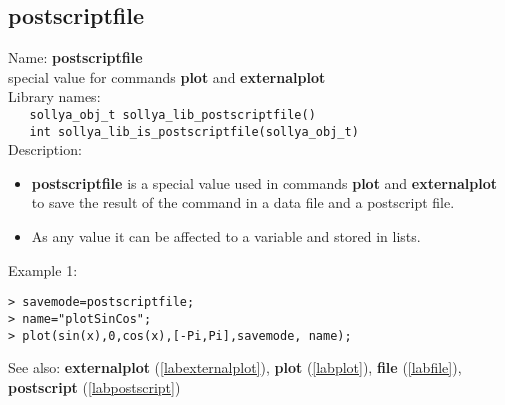 \subsection{postscriptfile}
\label{labpostscriptfile}
\noindent Name: \textbf{postscriptfile}\\
\phantom{aaa}special value for commands \textbf{plot} and \textbf{externalplot}\\[0.2cm]
\noindent Library names:\\
\verb|   sollya_obj_t sollya_lib_postscriptfile()|\\
\verb|   int sollya_lib_is_postscriptfile(sollya_obj_t)|\\[0.2cm]
\noindent Description: \begin{itemize}

\item \textbf{postscriptfile} is a special value used in commands \textbf{plot} and \textbf{externalplot} to save
   the result of the command in a data file and a postscript file.

\item As any value it can be affected to a variable and stored in lists.
\end{itemize}
\noindent Example 1: 
\begin{center}\begin{minipage}{15cm}\begin{Verbatim}[frame=single]
> savemode=postscriptfile;
> name="plotSinCos";
> plot(sin(x),0,cos(x),[-Pi,Pi],savemode, name);
\end{Verbatim}
\end{minipage}\end{center}
See also: \textbf{externalplot} (\ref{labexternalplot}), \textbf{plot} (\ref{labplot}), \textbf{file} (\ref{labfile}), \textbf{postscript} (\ref{labpostscript})
